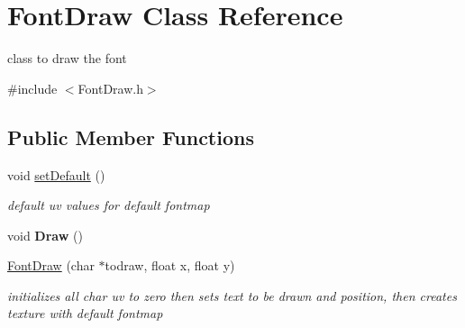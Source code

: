 \hypertarget{class_font_draw}{}\section{Font\+Draw Class Reference}
\label{class_font_draw}


class to draw the font  




{\ttfamily \#include $<$Font\+Draw.\+h$>$}

\subsection*{Public Member Functions}
\begin{DoxyCompactItemize}
\item 
\hypertarget{class_font_draw_a8258d8534ed7c1d8495a761f73d79fdc}{}void \hyperlink{class_font_draw_a8258d8534ed7c1d8495a761f73d79fdc}{set\+Default} ()\label{class_font_draw_a8258d8534ed7c1d8495a761f73d79fdc}

\begin{DoxyCompactList}\small\item\em default uv values for default fontmap \end{DoxyCompactList}\item 
\hypertarget{class_font_draw_a88ff4d56be792df6541603e09fff746e}{}void {\bfseries Draw} ()\label{class_font_draw_a88ff4d56be792df6541603e09fff746e}

\item 
\hypertarget{class_font_draw_ab0138d982c3d3587dbb280cdef175066}{}\hyperlink{class_font_draw_ab0138d982c3d3587dbb280cdef175066}{Font\+Draw} (char $\ast$todraw, float x, float y)\label{class_font_draw_ab0138d982c3d3587dbb280cdef175066}

\begin{DoxyCompactList}\small\item\em initializes all char uv to zero then sets text to be drawn and position, then creates texture with default fontmap \end{DoxyCompactList}\end{DoxyCompactItemize}
